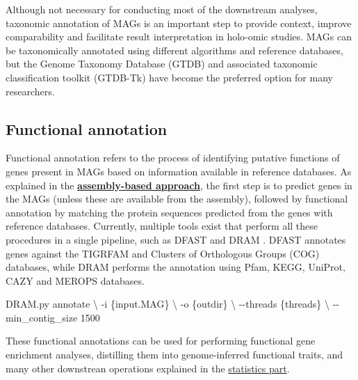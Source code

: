 \documentclass[
]{book}
\newenvironment{Shaded}{\begin{snugshade}}{\end{snugshade}}
\newcommand{\AttributeTok}[1]{\textcolor[rgb]{0.13,0.29,0.53}{#1}}
\newcommand{\DataTypeTok}[1]{\textcolor[rgb]{0.13,0.29,0.53}{#1}}
\newcommand{\ExtensionTok}[1]{#1}
\newcommand{\NormalTok}[1]{#1}
\begin{document}
Although not necessary for conducting most of the downstream analyses, taxonomic annotation of MAGs is an important step to provide context, improve comparability and facilitate result interpretation in holo-omic studies. MAGs can be taxonomically annotated using different algorithms and reference databases, but the Genome Taxonomy Database (GTDB) \citep{Parks2022-zl} and associated taxonomic classification toolkit (GTDB-Tk) \citep{Chaumeil2022-jr} have become the preferred option for many researchers.

\hypertarget{genome-resolved-function}{%
\subsection*{Functional annotation}\label{genome-resolved-function}}

Functional annotation refers to the process of identifying putative functions of genes present in MAGs based on information available in reference databases. As explained in the \textbf{\protect\hyperlink{assembly-based}{assembly-based approach}}, the first step is to predict genes in the MAGs (unless these are available from the assembly), followed by functional annotation by matching the protein sequences predicted from the genes with reference databases. Currently, multiple tools exist that perform all these procedures in a single pipeline, such as DFAST \citep{Tanizawa2017-uy} and DRAM \citep{Shaffer2020-kp}. DFAST annotates genes against the TIGRFAM and Clusters of Orthologous Groups (COG) databases, while DRAM performs the annotation using Pfam, KEGG, UniProt, CAZY and MEROPS databases.

\small

\begin{Shaded}
\begin{Highlighting}[]
\ExtensionTok{DRAM.py}\NormalTok{ annotate }\DataTypeTok{\textbackslash{}}
      \AttributeTok{{-}i}\NormalTok{ \{input.MAG\} }\DataTypeTok{\textbackslash{}}
      \AttributeTok{{-}o}\NormalTok{ \{outdir\} }\DataTypeTok{\textbackslash{}}
      \AttributeTok{{-}{-}threads}\NormalTok{ \{threads\} }\DataTypeTok{\textbackslash{}}
      \AttributeTok{{-}{-}min\_contig\_size}\NormalTok{ 1500}
\end{Highlighting}
\end{Shaded}

\normalsize

These functional annotations can be used for performing functional gene enrichment analyses, distilling them into genome-inferred functional traits, and many other downstrean operations explained in the \protect\hyperlink{about-statistics}{statistics part}.
\end{document}
